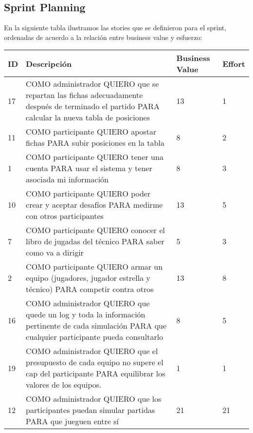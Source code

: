 \subsection{Sprint Planning}

\indent En la siguiente tabla ilustramos las stories que se definieron para el sprint, ordenadas de acuerdo a la relación entre business value y esfuerzo:\\

\begin{center}
  \begin{tabular}{| l | p{10cm} | l | l | }
    \hline
ID & Descripción & Business Value & Effort\\  \hline
17 & COMO administrador QUIERO que se repartan las fichas adecuadamente después de terminado el partido PARA calcular la nueva tabla de posiciones & 13 & 1\\  \hline
11 & COMO participante QUIERO apostar fichas PARA subir posiciones en la tabla & 8 & 2\\  \hline
1 & COMO participante QUIERO tener una cuenta PARA usar el sistema y tener asociada mi información & 8 & 3\\  \hline
10 & COMO participante QUIERO poder crear y aceptar desafíos PARA medirme con otros participantes & 13 & 5\\  \hline
7 & COMO participante QUIERO conocer el libro de jugadas del técnico PARA saber como va a dirigir & 5 & 3\\  \hline
2 & COMO participante QUIERO armar un equipo (jugadores, jugador estrella y técnico) PARA competir contra otros & 13 & 8\\  \hline
16 & COMO administrador QUIERO que quede un log y toda la información pertinente de cada simulación PARA que cualquier participante pueda consultarlo & 8 & 5\\  \hline
19 & COMO administrador QUIERO que el presupuesto de cada equipo no supere el cap del participante PARA equilibrar los valores de los equipos. & 1 & 1\\  \hline
12 & COMO administrador QUIERO que los participantes puedan simular partidas PARA que jueguen entre sí & 21 & 21\\  \hline
  \end{tabular}
\end{center}

